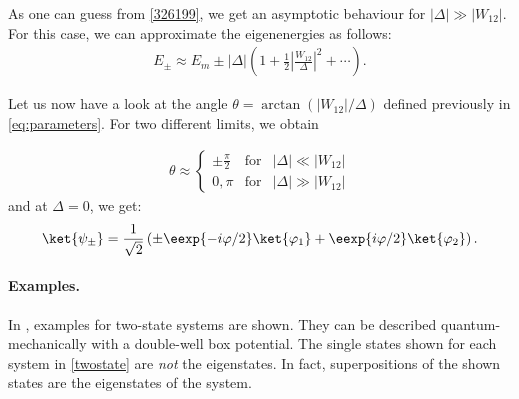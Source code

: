 As one can guess from \ref{326199}, we get an asymptotic behaviour for $|\Delta| \gg |W_{12}|$. For this case, we can approximate the eigenenergies as follows:
			\begin{align}
				E_\pm \approx E_m \pm |\Delta| \left( 1+\frac{1}{2} \left| \frac{W_{12}}{\Delta}\right| ^2+\cdots\right).
			\end{align}

			Let us now have a look at the angle $\theta=\arctan(|W_{12}|/\Delta)$ defined previously in \eqref{eq:parameters}. For two different limits, we obtain

			\begin{align}
				\theta \approx \left\{ \begin{array}{lcl} \pm \frac{\pi}{2} & \text{for} & |\Delta| \ll |W_{12}|\\
				0,\pi & \text{for} & |\Delta| \gg |W_{12}| \end{array} \right. 
			\end{align}
			and at $\Delta=0$, we get:
			\begin{align}
				\ket{\psi_\pm}=\frac{1}{\sqrt{2}}\left(\pm \eexp{-i{\varphi}/{2}}\ket{\varphi_1}+ \eexp{i{\varphi}/{2}}\ket{\varphi_2}\right).
			\end{align}
				\paragraph{Examples.} In , examples for two-state systems are shown. They can be described quantum-mechanically with a double-well box potential. The single states shown for each system in \ref{twostate} are \emph{not} the eigenstates. In fact, superpositions of the shown states are the eigenstates of the system.
